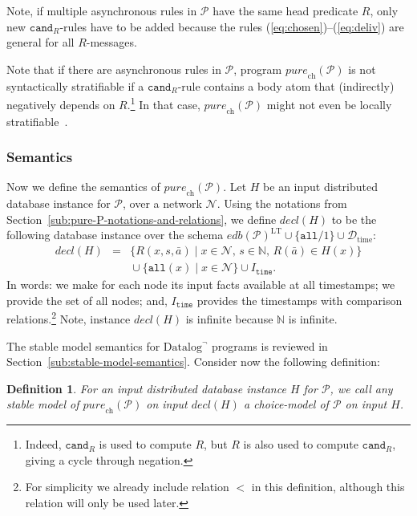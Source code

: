\documentclass{tlp}
\newtheorem{definition}{Definition}[section]
\newcommand{\langname}[1]{\text{#1}}  \newcommand{\pred}[1]{\mathtt{#1}}  \newcommand{\fname}[1]{\mathit{#1}}  \newcommand{\sq}[1]{`{#1}'}
\newcommand{\datalogneg}{\langname{Datalog}^{\neg}}
\newcommand{\Nat}{\mathbb{N}}  \newcommand{\len}[1]{|#1|} \newcommand{\rom}[1]{\text{\emph{(#1)}}} \newcommand{\romI}{\rom i}
\newcommand{\ded}{\mathcal{P}}
\newcommand{\rar}[2]{#1/#2}
\newcommand{\sch}{\mathcal{D}}
\newcommand{\edb}[1]{\fname{edb}(#1)}
\newcommand{\nw}{\mathcal{N}}
\newcommand{\toloct}[1]{#1^{\mathrm{LT}}}
\newcommand{\reltime}{\pred{time}}
\newcommand{\relall}{\pred{all}}
\newcommand{\schtime}{\sch_{\mathrm{time}}}
\newcommand{\Itime}{I_{\reltime}}
\newcommand{\cand}{\pred{cand}}
\newcommand{\purech}[1]{\fname{pure}_{\mathrm{ch}}(#1)}
\newcommand{\decl}[1]{\fname{decl}(#1)}
\begin{document}
Note, if multiple asynchronous rules in $\ded$ have the same head
predicate $R$, only new $\cand_{R}$-rules have to be added because
the rules (\ref{eq:chosen})--(\ref{eq:deliv}) are general for all
$R$-messages.



Note that if there are asynchronous rules in $\ded$, program $\purech{\ded}$
is not syntactically stratifiable if a $\cand_{R}$-rule contains
a body atom that (indirectly) negatively depends on $R$.\footnote{Indeed, $\cand_{R}$ is used to compute $R$, but $R$ is also used
to compute $\cand_{R}$, giving a cycle through negation.} In that case, $\purech{\ded}$ might not even be locally stratifiable~\cite{apt_bol}.


\subsubsection{Semantics}

Now we define the semantics of $\purech{\ded}$. Let $H$ be an input
distributed database instance for $\ded$, over a network $\nw$.
Using the notations from Section~\ref{sub:pure-P-notations-and-relations},
we define $\decl H$ to be the following database instance over the
schema $\toloct{\edb{\ded}}\cup\{\rar{\relall}1\}\cup\schtime$:
\begin{eqnarray*}
\decl H & = & \{R(x,s,\bar{a})\mid x\in\nw,\, s\in\Nat,\, R(\bar{a})\in H(x)\}\\
 &  & {}\cup\{\relall(x)\mid x\in\nw\}\cup\Itime.
\end{eqnarray*}
In words: we make for each node its input facts available at all timestamps;
we provide the set of all nodes; and, $\Itime$ provides the timestamps
with comparison relations.\footnote{For simplicity we already include relation $<$ in this definition,
although this relation will only be used later.} Note, instance $\decl H$ is infinite because $\Nat$ is infinite.

The stable model semantics for $\datalogneg$ programs is reviewed
in Section~\ref{sub:stable-model-semantics}. Consider now the following
definition:



\begin{definition}For an input distributed database instance $H$
for $\ded$, we call any stable model of $\purech{\ded}$ on input
$\decl H$ a \emph{choice-model} of $\ded$ on input $H$.\end{definition}
\end{document}
